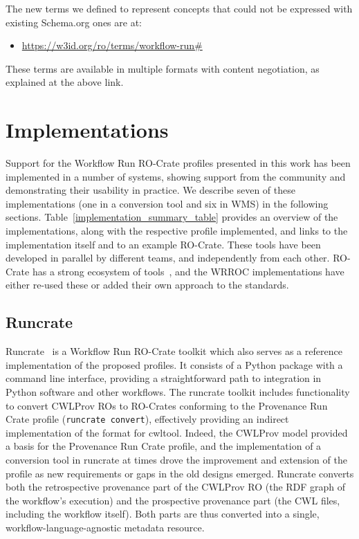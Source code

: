 \documentclass[10pt,letterpaper]{article}
\providecommand{\DIFaddbegin}{} %
\providecommand{\DIFaddend}{} %
\providecommand{\DIFdelbegin}{} %
\providecommand{\DIFdelend}{} %
\newcommand{\DIFscaledelfig}{0.5}
\newlength{\DIFdelgraphicswidth} %
\newlength{\DIFdelgraphicsheight} %
\newcommand{\DIFaddincludegraphics}[2][]{{\color{blue}\fbox{\DIFOincludegraphics[#1]{#2}}}} %
\newcommand{\DIFdelincludegraphics}[2][]{%
\sbox{\DIFdelgraphicsbox}{\DIFOincludegraphics[#1]{#2}}%
\settoboxwidth{\DIFdelgraphicswidth}{\DIFdelgraphicsbox} %
\settoboxtotalheight{\DIFdelgraphicsheight}{\DIFdelgraphicsbox} %
\scalebox{\DIFscaledelfig}{%
\parbox[b]{\DIFdelgraphicswidth}{\usebox{\DIFdelgraphicsbox}\\[-\baselineskip] \rule{\DIFdelgraphicswidth}{0em}}\llap{\resizebox{\DIFdelgraphicswidth}{\DIFdelgraphicsheight}{%
\setlength{\unitlength}{\DIFdelgraphicswidth}%
\begin{picture}(1,1)%
\thicklines\linethickness{2pt} %
{\color[rgb]{1,0,0}\put(0,0){\framebox(1,1){}}}%
{\color[rgb]{1,0,0}\put(0,0){\line( 1,1){1}}}%
{\color[rgb]{1,0,0}\put(0,1){\line(1,-1){1}}}%
\end{picture}%
}\hspace*{3pt}}} %
} %
\DeclareRobustCommand{\DIFaddbegin}{\DIFOaddbegin \let\includegraphics\DIFaddincludegraphics} %
\DeclareRobustCommand{\DIFaddend}{\DIFOaddend \let\includegraphics\DIFOincludegraphics} %
\DeclareRobustCommand{\DIFdelbegin}{\DIFOdelbegin \let\includegraphics\DIFdelincludegraphics} %
\DeclareRobustCommand{\DIFdelend}{\DIFOaddend \let\includegraphics\DIFOincludegraphics} %
\begin{document}
The new terms we defined to represent concepts that could not be expressed with existing Schema.org ones are at:
%
\begin{itemize}
    \item \DIFdelbegin %
\DIFdelend \DIFaddbegin \url{https://w3id.org/ro/terms/workflow-run\#}
\DIFaddend \end{itemize}
%
These terms are available in multiple formats with content negotiation, as explained at the above link.

\section{Implementations}\label{implementations}

Support for the Workflow Run RO-Crate profiles presented in this work has been implemented in a number of systems, showing support from the community and demonstrating their usability in practice.
We describe seven of these implementations (one in a conversion tool and six in WMS) in the following sections.
Table~\ref{implementation_summary_table} provides an overview of the implementations, along with the respective profile implemented, and links to the implementation itself and to an example RO-Crate.
%
These tools have been developed in parallel by different teams, and independently from each other.
RO-Crate has a strong ecosystem of tools~\cite{Soiland-Reyes 2022a}, and the WRROC implementations have either re-used these or added their own approach to the standards.


\subsection{Runcrate}\label{runcrate}

Runcrate~\cite{runcrate} is a Workflow Run RO-Crate toolkit which also serves as a reference implementation of the proposed profiles.
It consists of a Python package with a command line interface, providing a straightforward path to integration in Python software and other workflows.
The runcrate toolkit includes functionality to convert CWLProv ROs to RO-Crates conforming to the Provenance Run Crate profile (\texttt{runcrate convert}), effectively providing an indirect implementation of the format for cwltool.
Indeed, the CWLProv model provided a basis for the Provenance Run Crate profile, and the implementation of a conversion tool in runcrate at times drove the improvement and extension of the profile as new requirements or gaps in the old designs emerged.
Runcrate converts both the retrospective provenance part of the CWLProv RO (the RDF graph of the workflow's execution) and the prospective provenance part (the CWL files, including the workflow itself).
Both parts are thus converted into a single, workflow-language-agnostic metadata resource.
\end{document}
